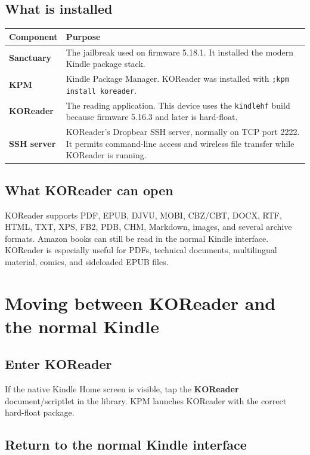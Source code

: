 \documentclass[10pt,letterpaper]{article}
\begin{document}
\subsection{What is installed}

\begin{tabularx}{\textwidth}{>{\bfseries\sffamily}p{} X}
\toprule
Component & Purpose \\
\midrule
Sanctuary & The jailbreak used on firmware 5.18.1. It installed the modern Kindle package stack. \\
KPM & Kindle Package Manager. KOReader was installed with \texttt{;kpm install koreader}. \\
KOReader & The reading application. This device uses the \texttt{kindlehf} build because firmware 5.16.3 and later is hard-float. \\
SSH server & KOReader's Dropbear SSH server, normally on TCP port 2222. It permits command-line access and wireless file transfer while KOReader is running. \\
\bottomrule
\end{tabularx}

\subsection{What KOReader can open}

KOReader supports PDF, EPUB, DJVU, MOBI, CBZ/CBT, DOCX, RTF, HTML, TXT, XPS, FB2, PDB, CHM, Markdown, images, and several archive formats. Amazon books can still be read in the normal Kindle interface. KOReader is especially useful for PDFs, technical documents, multilingual material, comics, and sideloaded EPUB files.

\section{Moving between KOReader and the normal Kindle}

\subsection{Enter KOReader}

If the native Kindle Home screen is visible, tap the \textbf{KOReader} document/scriptlet in the library. KPM launches KOReader with the correct hard-float package.

\subsection{Return to the normal Kindle interface}
\end{document}
